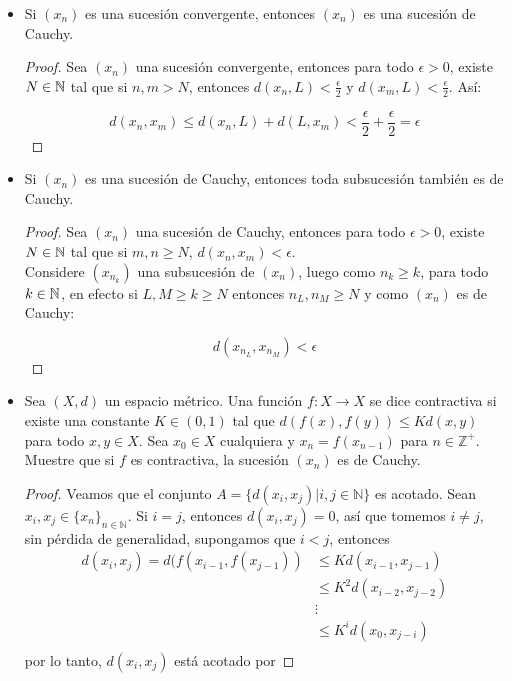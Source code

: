 \begin{itemize}[label={✎},leftmargin=*]
    \item Si $(x_n)$ es una sucesión convergente, entonces $(x_n)$ es una sucesión de Cauchy.

    \begin{proof}
    Sea $(x_n)$ una sucesión convergente, entonces para todo $\epsilon>0$, existe $N\in \mathbb{N}$ tal que si $n,m>N$, entonces $d(x_n,L)<\frac{\epsilon}{2}$ y $d(x_m,L)<\frac{\epsilon}{2}$. Así:

    $$d(x_n,x_m)\leq d(x_n,L)+d(L,x_m)<\frac{\epsilon}{2}+\frac{\epsilon}{2}=\epsilon$$
    \end{proof}

    \item Si $(x_n)$ es una sucesión de Cauchy, entonces toda subsucesión también es de Cauchy.

    \begin{proof}
        Sea $(x_n)$ una sucesión de Cauchy, entonces para todo $\epsilon>0$, existe $N\in \mathbb{N}$ tal que si $m,n\geq N$, $d(x_n,x_m)<\epsilon$.\\

        Considere $(x_{n_k})$ una subsucesión de $(x_n)$, luego como $n_k\geq k$, para todo $k\in \mathbb{N}$, en efecto si $L,M\geq k\geq N$ entonces $n_L,n_M\geq N$ y como $(x_n)$ es de Cauchy:

        $$d(x_{n_L},x_{n_M})<\epsilon$$ 
    \end{proof}

    \item Sea $(X,d)$ un espacio métrico. Una función $f:X \longrightarrow X$ se dice contractiva si existe una constante $K \in (0,1)$ tal que $d(f(x),f(y))\leq Kd(x,y)$ para todo $x,y \in X$. Sea $x_0 \in X$ cualquiera y $x_n=f(x_{n-1})$ para $n \in \mathbb{Z}^+$. Muestre que si $f$ es contractiva, la sucesión $(x_n)$ es de Cauchy.
    \begin{proof}
        Veamos que el conjunto $A=\{d(x_i,x_j)| i,j \in \mathbb{N}\}$ es acotado. Sean $x_i,x_j \in \{x_n\}_{n \in \mathbb{N}}$. Si $i=j$, entonces $d(x_i,x_j)=0$, así que tomemos $i \neq j$, sin pérdida de generalidad, supongamos que $i<j$, entonces
        \begin{align*}
            d(x_i,x_j)=d(f(x_{i-1},f(x_{j-1})) &\leq Kd(x_{i-1},x_{j-1})\\
            &\leq K^2d(x_{i-2},x_{j-2})\\
            &\vdots\\
            &\leq K^id(x_0,x_{j-i})\\
        \end{align*}
        por lo tanto, $d(x_i,x_j)$ está acotado por 

        
    \end{proof}
\end{itemize}



